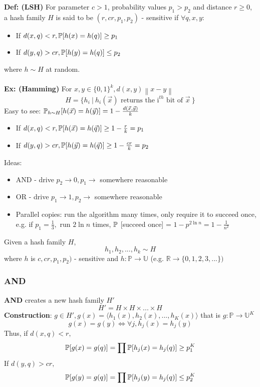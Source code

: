 \documentclass[12pt]{article}
\begin{document}
\textbf{Def: (LSH)} For parameter $c>1$, probability values $p_1 > p_2$ and distance $r \geq 0$, a hash family $H$ is said to be $(r, cr, p_1, p_2)$ - sensitive if $\forall q, x, y$:
\begin{itemize}
  \item If $d(x, q) < r, \mathbb{P} [h(x)=h(q)] \geq p_1$
  \item  If $d(y, q) > cr, \mathbb{P} [h(y)=h(q)] \leq p_2$
\end{itemize}
where $h \sim H$ at random.\\ \\
\textbf{Ex: (Hamming)} For $x,y \in  \{ 0, 1\}^k, d(x, y) \left\lVert x - y \right\rVert $
$$H = \Big\{ h_i\  |\  h_i(\vec{x}) \textrm{\ returns the i}^{th} \textrm{\ bit of\ } \vec{x}\ \Big\}$$
Easy to see: $\mathbb{P}_{h \sim H}[h(\vec{x}) = h(\vec{y})] = 1 - \frac{d(\vec{x}, \vec{y})}{k}$
\begin{itemize}
\item If $d(x, q) < r, \mathbb{P}[h(\vec{x}) = h(\vec{q})] \geq 1 - \frac{r}{k} = p_1$
\item If $d(y, q) > cr, \mathbb{P}[h(\vec{y}) = h(\vec{q})] \geq 1 - \frac{cr}{k} = p_2$
\end{itemize}
\clearpage
Ideas:
\begin{itemize}
\item AND - drive $p_2 \rightarrow 0, p_1 \rightarrow$ somewhere reasonable   
\item OR - drive $p_1 \rightarrow 1, p_2 \rightarrow$ somewhere reasonable
\item Parallel copies: run the algorithm many times, only require it to succeed once, e.g. if $p_1 = \frac{1}{3},$ run $2\ln n$ times, $\mathbb{P}$ [succeed once] = $1 - p^{2\ln n} = 1 -\frac{1}{n^2}$
\end{itemize}
Given a hash family $H$,
$$h_1, h_2, ..., h_k \sim H$$
where $h$ is $c, cr, p_1, p_2)$ -  sensitive and $h: \mathbb{P} \rightarrow \mathbb{U}$ (e.g. $\mathbb{R} \rightarrow \{0, 1, 2, 3, ... \})$

\subsubsection{AND}
\textbf{AND} creates a new hash family $H'$
$$H' = H \times H \times ... \times H$$
\textbf{Construction}: 
$g \in H', g(x)= \langle h_1(x), h_2(x), ..., h_K(x) \rangle$ that is $g: \mathbb{P} \rightarrow \mathbb{U}^K$
$$g(x) = g(y) \iff \forall j, h_j(x) = h_j(y)$$
Thus, if $d(x, q) < r,$
$$\mathbb{P} [g(x)=g(q)] = \prod \mathbb{P} [h_j(x)=h_j(q)] \geq p_1^K$$
If $d(y, q) > cr,$
$$\mathbb{P} [g(y)=g(q)] = \prod \mathbb{P} [h_j(y)=h_j(q)] \leq p_2^K$$
\end{document}
